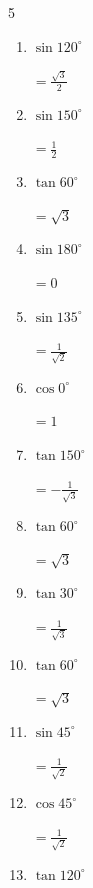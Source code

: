 \begin{multicols}{5}
\begin{enumerate}
        $\displaystyle =1$

  \item $\displaystyle \sin{120^\circ}$

        $\displaystyle =\frac{\sqrt{3}}{2}$

  \item $\displaystyle \sin{150^\circ}$

        $\displaystyle =\frac{1}{2}$

  \item $\displaystyle \tan{60^\circ}$

        $\displaystyle =\sqrt{3}$

  \item $\displaystyle \sin{180^\circ}$

        $\displaystyle =0$

  \item $\displaystyle \sin{135^\circ}$

        $\displaystyle =\frac{1}{\sqrt{2}}$

  \item $\displaystyle \cos{0^\circ}$

        $\displaystyle =1$

  \item $\displaystyle \tan{150^\circ}$

        $\displaystyle =-\frac{1}{\sqrt{3}}$

  \item $\displaystyle \tan{60^\circ}$

        $\displaystyle =\sqrt{3}$

  \item $\displaystyle \tan{30^\circ}$

        $\displaystyle =\frac{1}{\sqrt{3}}$

\columnbreak %

  \item $\displaystyle \tan{60^\circ}$

        $\displaystyle =\sqrt{3}$

  \item $\displaystyle \sin{45^\circ}$

        $\displaystyle =\frac{1}{\sqrt{2}}$

  \item $\displaystyle \cos{45^\circ}$

        $\displaystyle =\frac{1}{\sqrt{2}}$

  \item $\displaystyle \tan{120^\circ}$


\end{enumerate}
\end{multicols}
